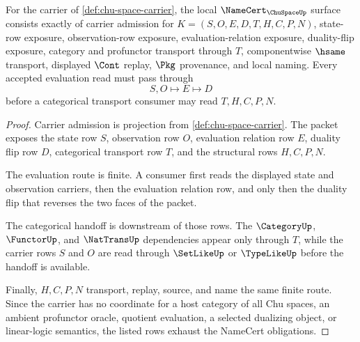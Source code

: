 \begin{theorem}
\label{thm:chu-space-namecert-obligations}
For the carrier of \autoref{def:chu-space-carrier}, the local $\NameCert_{\ChuSpaceUp}$ surface consists exactly of carrier admission for $K=(S,O,E,D,T,H,C,P,N)$, state-row exposure, observation-row exposure, evaluation-relation exposure, duality-flip exposure, category and profunctor transport through $T$, componentwise $\hsame$ transport, displayed $\Cont$ replay, $\Pkg$ provenance, and local naming. Every accepted evaluation read must pass through
$$
S,O \longmapsto E \longmapsto D
$$
before a categorical transport consumer may read $T,H,C,P,N$.
\end{theorem}
\begin{proof}
Carrier admission is projection from \autoref{def:chu-space-carrier}. The packet exposes the state row $S$, observation row $O$, evaluation relation row $E$, duality flip row $D$, categorical transport row $T$, and the structural rows $H,C,P,N$.

The evaluation route is finite. A consumer first reads the displayed state and observation carriers, then the evaluation relation row, and only then the duality flip that reverses the two faces of the packet.

The categorical handoff is downstream of those rows. The $\CategoryUp$, $\FunctorUp$, and $\NatTransUp$ dependencies appear only through $T$, while the carrier rows $S$ and $O$ are read through $\SetLikeUp$ or $\TypeLikeUp$ before the handoff is available.

Finally, $H,C,P,N$ transport, replay, source, and name the same finite route. Since the carrier has no coordinate for a host category of all Chu spaces, an ambient profunctor oracle, quotient evaluation, a selected dualizing object, or linear-logic semantics, the listed rows exhaust the NameCert obligations.
\end{proof}

